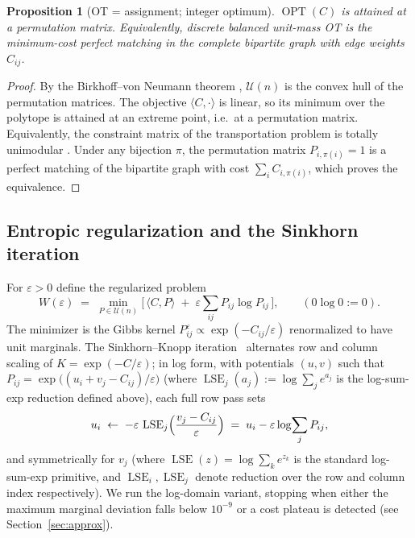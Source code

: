 \documentclass[11pt]{article}
\newtheorem{proposition}{Proposition}
\theoremstyle{remark}
\begin{document}
\begin{proposition}[OT = assignment; integer optimum]
\label{prop:int}
$\operatorname{OPT}(C)$ is attained at a permutation matrix. Equivalently,
discrete balanced unit-mass OT is the minimum-cost perfect matching in the
complete bipartite graph with edge weights $C_{ij}$.
\end{proposition}
\begin{proof}
By the Birkhoff--von Neumann theorem \cite{birkhoff1946},
$\mathcal{U}(n)$ is the convex hull of the permutation matrices. The
objective $\langle C,\cdot\rangle$ is linear, so its minimum over the
polytope is attained at an extreme point, i.e.\ at a permutation matrix.
Equivalently, the constraint matrix of the transportation problem is
totally unimodular \cite{schrijver2003}. Under any bijection $\pi$, the
permutation matrix $P_{i,\pi(i)}=1$ is a perfect matching of the bipartite
graph with cost $\sum_i C_{i,\pi(i)}$, which proves the equivalence.
\end{proof}

\subsection{Entropic regularization and the Sinkhorn iteration}
For $\varepsilon>0$ define the regularized problem
\begin{equation}
\label{eq:weps}
W(\varepsilon) \;=\; \min_{P\in \mathcal{U}(n)}
\bigl[\,\langle C,P\rangle \;+\; \varepsilon \sum_{ij} P_{ij}\log P_{ij}\,\bigr],
\qquad (0\log 0 := 0).
\end{equation}
The minimizer is the Gibbs kernel $P^{\varepsilon}_{ij}\propto
\exp(-C_{ij}/\varepsilon)$ renormalized to have unit marginals.
The Sinkhorn--Knopp iteration~\cite{sinkknopp1967,cuturi2013} alternates
row and column scaling of $K=\exp(-C/\varepsilon)$; in log form, with
potentials $(u,v)$ such that
$P_{ij}=\exp\bigl((u_i+v_j-C_{ij})/\varepsilon\bigr)$ (where
$\operatorname{LSE}_j(a_j):=\log\sum_j e^{a_j}$ is the log-sum-exp
reduction defined above), each full row pass sets
\begin{equation}
\label{eq:sinkupdate}
u_i \;\leftarrow\; -\varepsilon\,\operatorname{LSE}_j\Bigl(\frac{v_j-C_{ij}}{\varepsilon}\Bigr)
\;=\; u_i-\varepsilon\log\!\sum_j P_{ij},
\end{equation}
and symmetrically for $v_j$
(where $\operatorname{LSE}(z)=\log\sum_k e^{z_k}$ is the standard
log-sum-exp primitive, and $\operatorname{LSE}_i,\operatorname{LSE}_j$
denote reduction over the row and column index respectively).
We run the log-domain variant, stopping when either the maximum marginal
deviation falls below $10^{-9}$ or a cost plateau is detected (see
Section~\ref{sec:approx}).
\end{document}
